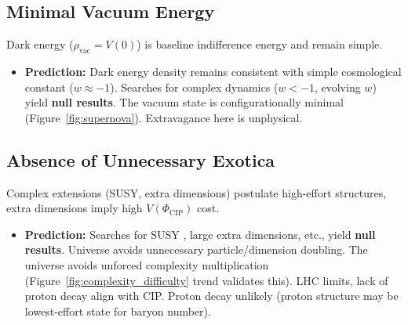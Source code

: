 \documentclass[11pt, a4paper]{article}
\newcommand{\subt}[1]{\mathrm{#1}}
\begin{document}
\subsection{Minimal Vacuum Energy} \label{sec:pred_vac}
Dark energy ($\rho_{\subt{vac}} = V(0)$) is baseline indifference energy and remain simple.
\begin{itemize}
    \item \textbf{Prediction:} Dark energy density remains consistent with simple cosmological constant ($w \approx -1$). Searches for complex dynamics ($w < -1$, evolving $w$) yield \textbf{null results}. The vacuum state is configurationally minimal (Figure~\ref{fig:supernova}). Extravagance here is unphysical.
\end{itemize}



\subsection{Absence of Unnecessary Exotica} \label{sec:pred_exotica}
Complex extensions (SUSY, extra dimensions) postulate high-effort structures, extra dimensions imply high $V(\Phi_{\subt{CIP}})$ cost.
\begin{itemize}
    \item \textbf{Prediction:} Searches for SUSY \cite{SupersymmetrySearches}, large extra dimensions, etc., yield \textbf{null results}. Universe avoids unnecessary particle/dimension doubling. The universe avoids unforced complexity multiplication (Figure~\ref{fig:complexity_difficulty} trend validates this). LHC limits, lack of proton decay align with CIP. Proton decay unlikely (proton structure may be lowest-effort state for baryon number).
\end{itemize}
\end{document}
